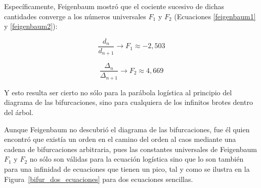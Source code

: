 \documentclass[letterpaper, 11pt, oneside]{article}
\theoremstyle{definition}
\theoremstyle{remark}
\begin{document}
\begin{itemize}
Específicamente, Feigenbaum mostró que el cociente sucesivo de dichas cantidades converge a los números universales $F_1$ y $F_2$ (Ecuaciones \ref{feigenbaum1} y \ref{feigenbaum2}):

\begin{equation}
	\frac {d_n} {d_{n+1}} \rightarrow F_1 \approx -2,503
	\label{feigenbaum1}
\end{equation}

\begin{equation}
	\frac {\Delta_n} {\Delta_{n+1}} \rightarrow F_2 \approx 4,669
	\label{feigenbaum2}
\end{equation}

Y esto resulta ser cierto no sólo para la parábola logística al principio del diagrama de las bifurcaciones, sino para cualquiera de los infinitos brotes dentro del árbol.

Aunque Feigenbaum no descubrió el diagrama de las bifurcaciones, fue él quien encontró que existía un orden en el camino del orden al caos mediante una cadena de bifurcaciones arbitraria, pues las constantes universales de Feigenbaum $F_1$ y $F_2$ no sólo son válidas para la ecuación logística sino que lo son también para una infinidad de ecuaciones que tienen un pico, tal y como se ilustra en la Figura~\ref{bifur_dos_ecuaciones} para dos ecuaciones sencillas.


\end{itemize}
\end{document}
